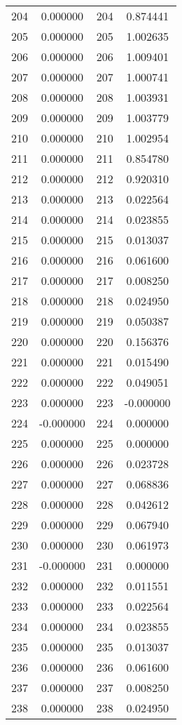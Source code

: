 \documentclass[12pt]{article}
\begin{document}
\begin{longtable}{@{}cccc@{}}
204 & 0.000000 & 204 & 0.874441 \\
205 & 0.000000 & 205 & 1.002635 \\
206 & 0.000000 & 206 & 1.009401 \\
207 & 0.000000 & 207 & 1.000741 \\
208 & 0.000000 & 208 & 1.003931 \\
209 & 0.000000 & 209 & 1.003779 \\
210 & 0.000000 & 210 & 1.002954 \\
211 & 0.000000 & 211 & 0.854780 \\
212 & 0.000000 & 212 & 0.920310 \\
213 & 0.000000 & 213 & 0.022564 \\
214 & 0.000000 & 214 & 0.023855 \\
215 & 0.000000 & 215 & 0.013037 \\
216 & 0.000000 & 216 & 0.061600 \\
217 & 0.000000 & 217 & 0.008250 \\
218 & 0.000000 & 218 & 0.024950 \\
219 & 0.000000 & 219 & 0.050387 \\
220 & 0.000000 & 220 & 0.156376 \\
221 & 0.000000 & 221 & 0.015490 \\
222 & 0.000000 & 222 & 0.049051 \\
223 & 0.000000 & 223 & -0.000000 \\
224 & -0.000000 & 224 & 0.000000 \\
225 & 0.000000 & 225 & 0.000000 \\
226 & 0.000000 & 226 & 0.023728 \\
227 & 0.000000 & 227 & 0.068836 \\
228 & 0.000000 & 228 & 0.042612 \\
229 & 0.000000 & 229 & 0.067940 \\
230 & 0.000000 & 230 & 0.061973 \\
231 & -0.000000 & 231 & 0.000000 \\
232 & 0.000000 & 232 & 0.011551 \\
233 & 0.000000 & 233 & 0.022564 \\
234 & 0.000000 & 234 & 0.023855 \\
235 & 0.000000 & 235 & 0.013037 \\
236 & 0.000000 & 236 & 0.061600 \\
237 & 0.000000 & 237 & 0.008250 \\
238 & 0.000000 & 238 & 0.024950 \\

\end{longtable}
\end{document}
